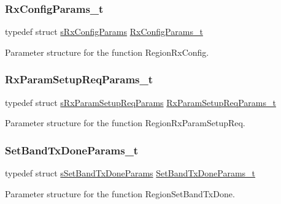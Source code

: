 \subsubsection{\texorpdfstring{Rx\+Config\+Params\+\_\+t}{RxConfigParams\_t}}
{\footnotesize\ttfamily typedef struct \hyperlink{structsRxConfigParams}{s\+Rx\+Config\+Params} \hyperlink{group__REGION_ga375c038078dfcfc7ef14280021db719e}{Rx\+Config\+Params\+\_\+t}}

Parameter structure for the function Region\+Rx\+Config. \mbox{\label{group__REGION_ga7165f282c670c728c36d534df2285157}} 
\subsubsection{\texorpdfstring{Rx\+Param\+Setup\+Req\+Params\+\_\+t}{RxParamSetupReqParams\_t}}
{\footnotesize\ttfamily typedef struct \hyperlink{structsRxParamSetupReqParams}{s\+Rx\+Param\+Setup\+Req\+Params} \hyperlink{group__REGION_ga7165f282c670c728c36d534df2285157}{Rx\+Param\+Setup\+Req\+Params\+\_\+t}}

Parameter structure for the function Region\+Rx\+Param\+Setup\+Req. \mbox{\label{group__REGION_gad0524aa0673c0814a71e7a4f9cade3fc}} 
\subsubsection{\texorpdfstring{Set\+Band\+Tx\+Done\+Params\+\_\+t}{SetBandTxDoneParams\_t}}
{\footnotesize\ttfamily typedef struct \hyperlink{structsSetBandTxDoneParams}{s\+Set\+Band\+Tx\+Done\+Params} \hyperlink{group__REGION_gad0524aa0673c0814a71e7a4f9cade3fc}{Set\+Band\+Tx\+Done\+Params\+\_\+t}}

Parameter structure for the function Region\+Set\+Band\+Tx\+Done. \mbox{\label{group__REGION_gabed730d4d04b0b60d4b6d1966d3f21d3}} 
